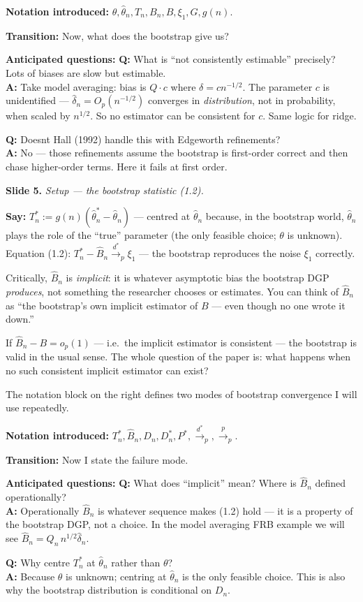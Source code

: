 \documentclass[11pt]{article}
\theoremstyle{definition}
\newcommand{\Pstar}{P^{*}}
\newcommand{\pto}{\xrightarrow{p}}
\newcommand{\dstarto}{\xrightarrow{d^{*}}}
\newcommand{\Tn}{T_{n}}
\newcommand{\Tns}{T_{n}^{*}}
\newcommand{\Bn}{B_{n}}
\newcommand{\Bnh}{\hat{B}_{n}}
\newcommand{\thn}{\hat{\theta}_{n}}
\newcommand{\thns}{\hat{\theta}_{n}^{*}}
\newcommand{\Dn}{D_{n}}
\newcommand{\Dns}{D_{n}^{*}}
\newcommand{\slide}[2]{%
  \medskip
  \noindent\colorbox{soft}{\parbox{\linewidth}{\textbf{Slide #1.} \textit{#2}}}
  \medskip
}
\newcommand{\say}[1]{\textbf{Say:} #1}
\newcommand{\trans}[1]{\textbf{Transition:} #1}
\newcommand{\Q}[2]{\noindent\textcolor{warn}{\textbf{Q:}} #1\\ \textcolor{accent}{\textbf{A:}} #2\par\smallskip}
\begin{document}
\textbf{Notation introduced:} $\theta,\thn,\Tn,\Bn,B,\xi_1,G,g(n)$.

\trans{Now, what does the bootstrap give us?}

\textbf{Anticipated questions:}
\Q{What is ``not consistently estimable'' precisely? Lots of biases are slow but estimable.}
{Take model averaging: bias is $Q\cdot c$ where $\delta=cn^{-1/2}$. The
parameter $c$ is unidentified --- $\hat\delta_n=O_p(n^{-1/2})$ converges in
\emph{distribution}, not in probability, when scaled by $n^{1/2}$. So no estimator
can be consistent for $c$. Same logic for ridge.}
\Q{Doesnt Hall (1992) handle this with Edgeworth refinements?}
{No --- those refinements assume the bootstrap is first-order correct and then
chase higher-order terms. Here it fails at first order.}

\slide{5}{Setup --- the bootstrap statistic (1.2).}
\say{$\Tns:=g(n)(\thns-\thn)$ --- centred at $\thn$ because, in the bootstrap
world, $\thn$ plays the role of the ``true'' parameter (the only feasible
choice; $\theta$ is unknown). Equation (1.2): $\Tns-\Bnh\dstarto_p\xi_1$
--- the bootstrap reproduces the noise $\xi_1$ correctly.

Critically, $\Bnh$ is \emph{implicit}: it is whatever asymptotic bias the
bootstrap DGP \emph{produces}, not something the researcher chooses or estimates.
You can think of $\Bnh$ as ``the bootstrap's own implicit estimator of $B$ ---
even though no one wrote it down.''

If $\Bnh-B=o_p(1)$ --- i.e.\ the implicit estimator is consistent --- the
bootstrap is valid in the usual sense. The whole question of the paper is:
what happens when no such consistent implicit estimator can exist?

The notation block on the right defines two modes of bootstrap convergence I
will use repeatedly.}

\textbf{Notation introduced:} $\Tns,\Bnh,\Dn,\Dns,\Pstar,\dstarto_p,\pto_p$.

\trans{Now I state the failure mode.}

\textbf{Anticipated questions:}
\Q{What does ``implicit'' mean? Where is $\Bnh$ defined operationally?}
{Operationally $\Bnh$ is whatever sequence makes (1.2) hold --- it is a
property of the bootstrap DGP, not a choice. In the model averaging FRB
example we will see $\Bnh = Q_n\, n^{1/2}\hat\delta_n$.}
\Q{Why centre $\Tns$ at $\thn$ rather than $\theta$?}
{Because $\theta$ is unknown; centring at $\thn$ is the only feasible choice.
This is also why the bootstrap distribution is conditional on $\Dn$.}
\end{document}
